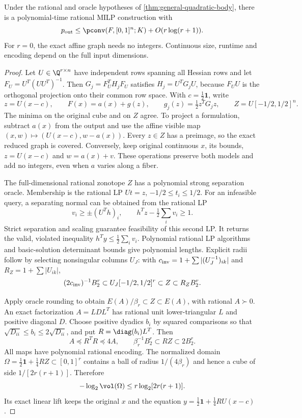 \begin{theorem}\label{thm:input-quotient}
Under the rational and oracle hypotheses of
\cref{thm:general-quadratic-body}, there is a polynomial-time rational
MILP construction with
\begin{equation}\label{eq:input-rank-count}
 p_{\rm out}\le\pconv(F,[0,1]^n;K)+O(r\log(r+1)).
\end{equation}
For $r=0$, the exact affine graph needs no integers. Continuous size,
runtime and encoding depend on the full input dimensions.
\end{theorem}
\begin{proof}
Let $U\in\Q^{r\times n}$ have independent rows spanning all Hessian
rows and let $F_U=U^T(UU^T)^{-1}$. Then
$G_j=F_U^TH_jF_U$ satisfies $H_j=U^TG_jU$, because $F_UU$ is the
orthogonal projection onto their common row space. With
$c=\frac12\mathbf1$, write
\[
 z=U(x-c),\qquad F(x)=a(x)+g(z),\qquad
 g_j(z)=\tfrac12z^TG_jz,\qquad Z=U[-1/2,1/2]^n.
\]
The minima on the original cube and on $Z$ agree. To project a formulation,
subtract $a(x)$ from the output and use the affine visible map
$(x,w)\mapsto(U(x-c),w-a(x))$. Every $z\in Z$ has a preimage, so the
exact reduced graph is covered. Conversely, keep original continuous
$x$, its bounds, $z=U(x-c)$ and $w=a(x)+v$. These operations preserve
both models and add no integers, even when $a$ varies along a fiber.

The full-dimensional rational zonotope $Z$ has a polynomial strong
separation oracle. Membership is the rational LP
$Ut=z$, $-1/2\le t_i\le1/2$. For an infeasible query, a separating
normal can be obtained from the rational LP
\[
 v_i\ge\pm(U^Th)_i,\qquad h^Tz-\tfrac12\sum_i v_i\ge1.
\]
Strict separation and scaling guarantee feasibility of this second LP.
It returns the valid, violated inequality
$h^Ty\le\frac12\sum_i v_i$. Polynomial rational LP algorithms and
basic-solution determinant bounds give polynomial lengths. Explicit
radii follow by selecting nonsingular columns $U_J$: with
$c_{\rm inv}=1+\sum|(U_J^{-1})_{ik}|$ and
$R_Z=1+\sum|U_{ik}|$,
\[
 (2c_{\rm inv})^{-1}B_2^r\subset U_J[-1/2,1/2]^r
                 \subset Z\subset R_ZB_2^r.
\]

Apply oracle rounding to obtain $E(A)/\beta_r\subset Z\subset E(A)$,
with rational $A\succ0$. An exact factorization $A=LDL^T$ has rational
unit lower-triangular $L$ and positive diagonal $D$. Choose positive
dyadics $b_i$ by squared comparisons so that
$\sqrt{D_{ii}}\le b_i\le2\sqrt{D_{ii}}$, and put
$R=\diag(b_i)L^T$. Then
\[
 A\preceq R^TR\preceq4A,\qquad
 \beta_r^{-1}B_2^r\subset RZ\subset2B_2^r.
\]
All maps have polynomial rational encoding. The normalized domain
$\Omega=\frac12\mathbf1+\frac14RZ\subset[0,1]^r$ contains a ball of
radius $1/(4\beta_r)$ and hence a cube of side $1/[2r(r+1)]$. Therefore
\begin{equation}\label{eq:quotient-domain-volume}
 -\log_2\vol(\Omega)\le r\log_2[2r(r+1)].
\end{equation}
Its exact linear lift keeps the original $x$ and the equation
$y=\frac12\mathbf1+\frac14RU(x-c)$.


\end{proof}
